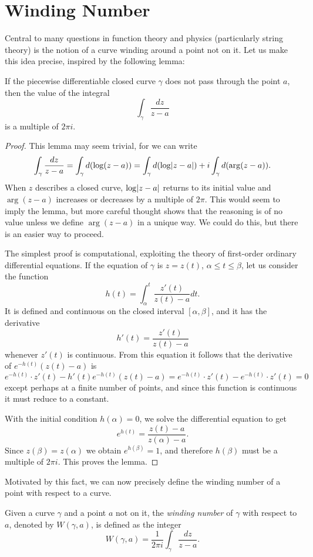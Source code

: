 \section{Winding Number}
Central to many questions in function theory and physics (particularly string theory) is the notion of a curve winding around a point not on it. Let us make this idea precise, inspired by the following lemma:
\begin{lemma}
If the piecewise differentiable closed curve $\gamma$ does not pass through the point $a$, then the value of the integral $$\int_{\gamma} \dfrac{dz}{z-a}$$ is a multiple of $2\pi i$.
\end{lemma}
\begin{proof}
This lemma may seem trivial, for we can write $$\int_{\gamma}\dfrac{dz}{z-a}=\int_{\gamma} d(\log(z-a))=\int_{\gamma}d(\log \lvert z-a \rvert)+i\int_{\gamma}d(\arg(z-a)).$$ When $z$ describes a closed curve, $\log\lvert z-a \rvert$ returns to its initial value and $\arg(z-a)$ increases or decreases by a multiple of $2\pi$. This would seem to imply the lemma, but more careful thought shows that the reasoning is of no value unless we define $\arg(z-a)$ in a unique way. We could do this, but there is an easier way to proceed.

The simplest proof is computational, exploiting the theory of first-order ordinary differential equations. If the equation of $\gamma$ is $z=z(t)$, $\alpha \le t \le \beta$, let us consider the function $$h(t)=\int_{\alpha}^{t}\dfrac{z'(t)}{z(t)-a}dt.$$ It is defined and continuous on the closed interval $[\alpha, \beta]$, and it has the derivative $$h'(t)=\dfrac{z'(t)}{z(t)-a}$$ whenever $z'(t)$ is continuous. From this equation it follows that the derivative of $e^{-h(t)}(z(t)-a)$ is $$e^{-h(t)} \cdot z'(t)-h'(t)e^{-h(t)}(z(t)-a)=e^{-h(t)} \cdot z'(t)-e^{-h(t)} \cdot z'(t)=0$$ except perhaps at a finite number of points, and since this function is continuous it must reduce to a constant.

With the initial condition $h(\alpha)=0$, we solve the differential equation to get $$e^{h(t)}=\dfrac{z(t)-a}{z(\alpha)-a}.$$ Since $z(\beta)=z(\alpha)$ we obtain $e^{h(\beta)}=1$, and therefore $h(\beta)$ must be a multiple of $2\pi i$. This proves the lemma.
\end{proof}

Motivated by this fact, we can now precisely define the winding number of a point with respect to a curve.

\begin{definition}
Given a curve $\gamma$ and a point $a$ not on it, the \emph{winding number} of $\gamma$ with respect to $a$, denoted by $W(\gamma, a)$, is defined as the integer $$W(\gamma, a)=\frac{1}{2\pi i}\int_{\gamma} \dfrac{dz}{z-a}.$$
\end{definition}

